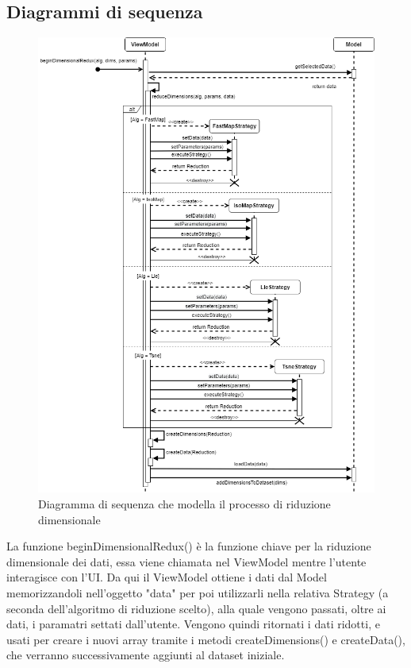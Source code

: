 \subsection{Diagrammi di sequenza}
\begin{figure}[hb]
\includegraphics[width=12cm]{Images/Allegato Tecnico-Sequenza-DR}
\centering
\caption{Diagramma di sequenza che modella il processo di riduzione dimensionale}
\end{figure}
La funzione beginDimensionalRedux() è la funzione chiave per la riduzione dimensionale dei dati, essa viene chiamata nel ViewModel mentre l'utente interagisce con l'UI. Da qui il ViewModel ottiene i dati dal Model memorizzandoli nell'oggetto "data" per poi utilizzarli nella relativa Strategy (a seconda dell'algoritmo di riduzione scelto), alla quale vengono passati, oltre ai dati, i paramatri settati dall'utente.
Vengono quindi ritornati i dati ridotti, e usati per creare i nuovi array tramite i metodi createDimensions() e createData(), che verranno successivamente aggiunti al dataset iniziale.
\newpage
